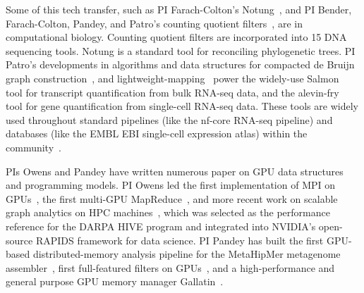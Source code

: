 Some of this tech transfer, such as PI Farach-Colton's 
Notung~\cite{ChenDuFa00}, and 
PI  Bender, Farach-Colton, Pandey, and Patro's counting quotient filters~\cite{PandeyBeJo17}, are  in computational biology. 
Counting quotient filters are incorporated into 15
DNA sequencing tools.
Notung is a standard tool for reconciling phylogenetic trees.
%
PI Patro's developments in algorithms and data structures for compacted de Bruijn graph construction~\cite{Khan2021,Khan2022}, and lightweight-mapping~\cite{Srivastava2016, Almodaresi2018Pufferfish, srivastava2020alignment, Almodaresi2021} power the widely-use Salmon~\cite{Patro2017Salmon} tool for transcript quantification from bulk RNA-seq data, and the alevin-fry~\cite{he2022alevin, He2023} tool for gene quantification from single-cell RNA-seq data. These tools are widely used throughout standard pipelines (like the nf-core RNA-seq pipeline) and databases (like the EMBL EBI single-cell expression atlas) within the community~\cite{Ewels2020,George2023}.


PIs Owens and Pandey have written numerous paper on GPU data structures and programming models.
PI Owens led the first implementation of MPI on GPUs~\cite{Stuart:2009:MPO:withouturl,Stuart:2011:EMT}, the first multi-GPU MapReduce~\cite{Stuart:2011:MMO}, and more recent work on scalable graph analytics on HPC machines~\cite{Pan:2018:SBS,Pan:2017:MGA,Chen:2022:SIP}, which was selected as the performance reference for the DARPA HIVE program and integrated into NVIDIA's open-source RAPIDS framework for data science. PI Pandey has built the first GPU-based distributed-memory \kmer analysis pipeline for the MetaHipMer metagenome assembler~\cite{nisa2021distributed, DBLP:conf/ppopp/McCoyHY023}, first full-featured filters on GPUs~\cite{McCoyHYP23a}, and a high-performance and general purpose GPU memory manager Gallatin~\cite{mccoy2024gallatin}.



